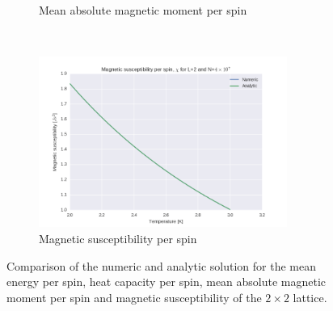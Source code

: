 \documentclass[a4paper, 10pt]{article}
\begin{document}
\begin{figure}[!ht]
\begin{subfigure}[H!]{0.5\textwidth}
        \caption{Mean absolute magnetic moment per spin}
    \end{subfigure}%
    ~ 
    \begin{subfigure}[H!]{0.5\textwidth}
        \centering
        \includegraphics[height=2.2in]{L2MagSus4e7.png}
        \caption{Magnetic susceptibility per spin}
    \end{subfigure}
    \caption{Comparison of the numeric and  analytic solution for the mean energy per spin, heat capacity per spin, mean absolute magnetic moment per spin and magnetic susceptibility of the $2 \times 2$ lattice. }\label{fig:2x2_thermo}
\end{figure}
\end{document}
